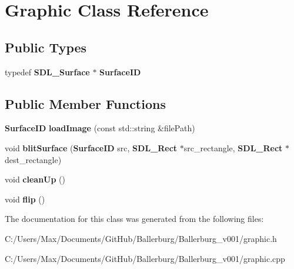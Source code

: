 \section{Graphic Class Reference}
\label{class_graphic}
\subsection*{Public Types}
\begin{DoxyCompactItemize}
\item 
typedef {\bf S\+D\+L\+\_\+\+Surface} $\ast$ {\bfseries Surface\+I\+D}\label{class_graphic_a089a4ef41832ffbc00306774c279c262}

\end{DoxyCompactItemize}
\subsection*{Public Member Functions}
\begin{DoxyCompactItemize}
\item 
{\bf Surface\+I\+D} {\bfseries load\+Image} (const std\+::string \&file\+Path)\label{class_graphic_a259fd9b61b67a164094bf9ba0b5044cd}

\item 
void {\bfseries blit\+Surface} ({\bf Surface\+I\+D} src, {\bf S\+D\+L\+\_\+\+Rect} $\ast$src\+\_\+rectangle, {\bf S\+D\+L\+\_\+\+Rect} $\ast$dest\+\_\+rectangle)\label{class_graphic_ae2ab1b6e70958efae02f7131493740ff}

\item 
void {\bfseries clean\+Up} ()\label{class_graphic_a15c85c04c5b78994c94013827e6095ea}

\item 
void {\bfseries flip} ()\label{class_graphic_af3dd8fed2b2384149643116bdb813c01}

\end{DoxyCompactItemize}


The documentation for this class was generated from the following files\+:\begin{DoxyCompactItemize}
\item 
C\+:/\+Users/\+Max/\+Documents/\+Git\+Hub/\+Ballerburg/\+Ballerburg\+\_\+v001/graphic.\+h\item 
C\+:/\+Users/\+Max/\+Documents/\+Git\+Hub/\+Ballerburg/\+Ballerburg\+\_\+v001/graphic.\+cpp\end{DoxyCompactItemize}
